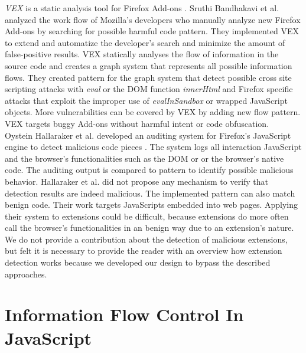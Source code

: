 	\textit{VEX} is a static analysis tool for Firefox Add-ons \cite{Bandhakavi:2011:VBE:1995376.1995398}. Sruthi Bandhakavi et al. analyzed the work flow of Mozilla's developers who manually analyze new Firefox Add-ons by searching for possible harmful code pattern. They implemented VEX to extend and automatize the developer's search and minimize the amount of false-positive results. VEX statically analyses the flow of information in the source code and creates a graph system that represents all possible information flows. They created pattern for the graph system that detect possible cross site scripting attacks with \textit{eval} or the DOM function \textit{innerHtml} and Firefox specific attacks that exploit the improper use of \textit{evalInSandbox} or wrapped JavaScript objects. More vulnerabilities can be covered by VEX by adding new flow pattern. VEX targets buggy Add-ons without harmful intent or code obfuscation. \\
	
	Oystein Hallaraker et al. developed an auditing system for Firefox's JavaScript engine to detect malicious code pieces \cite{Hallaraker:2005:DMJ:1078029.1078861}. The system logs all interaction JavaScript and the browser's functionalities such as the DOM or or the browser's native code. The auditing output is compared to pattern to identify possible malicious behavior. Hallaraker et al. did not propose any mechanism to verify that detection results are indeed malicious. The implemented pattern can also match benign code. Their work targets JavaScripts embedded into web pages. Applying their system to extensions could be difficult, because extensions do more often call the browser's functionalities in an benign way due to an extension's nature. \\
	
	We do not provide a contribution about the detection of malicious extensions, but felt it is necessary to provide the reader with an overview how extension detection works because we developed our design to bypass the described approaches.


\section{Information Flow Control In JavaScript}
	
